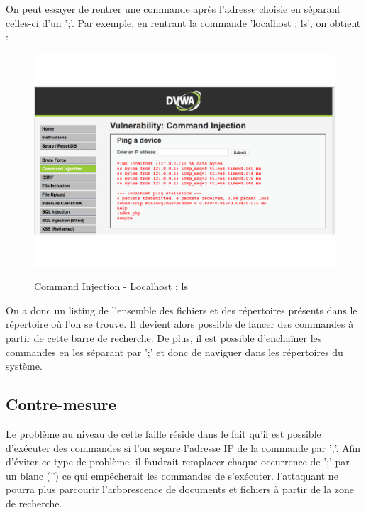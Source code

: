 On peut essayer de rentrer une commande après l'adresse choisie en séparant celles-ci d'un ';'. Par exemple, en rentrant la commande 'localhost ; ls', on obtient :

\begin{figure}[!h]
\begin{center}

\label{inclusion}
\includegraphics[scale=0.5]{images/CommandInjection-Localhostls.pdf}

\caption{Command Injection - Localhost ; ls}

\end{center}
\end{figure}

On a donc un listing de l'ensemble des fichiers et des répertoires présents dans le répertoire où l'on se trouve.
Il devient alors possible de lancer des commandes à partir de cette barre de recherche. De plus, il est possible d'enchaîner les commandes en les séparant par ';' et donc de naviguer dans les répertoires du système.


\subsection{Contre-mesure}

Le problème au niveau de cette faille réside dans le fait qu'il est possible d'exécuter des commandes si l'on separe l'adresse IP de la commande par ';'. Afin d'éviter ce type de problème, il faudrait remplacer chaque occurrence de ';' par un blanc ('') ce qui empêcherait les commandes de s'exécuter. l'attaquant ne pourra plus parcourir l'arborescence de documents et fichiers à partir de la zone de recherche.

